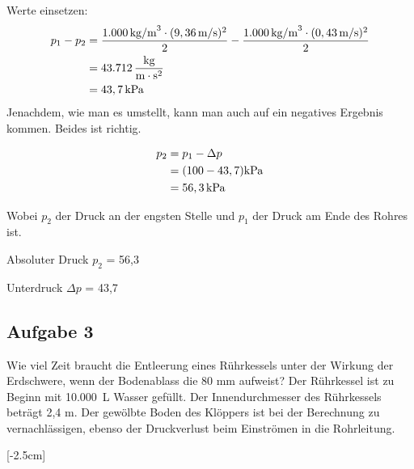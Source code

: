 \documentclass[a4paper,11pt]{article}
\newif\ifshowme
\begin{document}
\begin{marginfigure}[+2cm]
{\pp



Werte einsetzen: 
\begin{align*}
p_1 - p_2 &= \frac{1.000 \mskip3mu \text{kg/m}^3 \cdot (9,36\mskip3mu \text{m/s} )^2}{2} -  \frac{1.000 \mskip3mu \text{kg/m}^3 \cdot (0,43 \mskip3mu \text{m/s} )^2}{2} \\
&= 43.712 \mskip3mu \frac{\text{kg}}{\text{m} \cdot \text{s}^2} \\
&= 43,7 \mskip3mu \text{kPa}
\end{align*}
Jenachdem, wie man es umstellt, kann man auch auf ein negatives Ergebnis kommen. Beides ist richtig.

\begin{align*}
p_2 &= p_1 - \Delta p \\
	&= (100 - 43,7)\text{kPa}\\ &= 56,3\mskip3mu \text{kPa}
\end{align*}


Wobei $p_2$ der Druck an der engsten Stelle und $p_1$ der Druck am Ende des Rohres ist.
\par
Absoluter Druck $p_2$ = 56,3  \par 
Unterdruck $\Delta p$ = 43,7  \par 
}
\pagebreak
\else
\fi


\subsection*{Aufgabe 3}
Wie viel Zeit braucht die Entleerung eines Rührkessels unter der Wirkung der \mbox{Erdschwere}, wenn der Bodenablass die  80 mm aufweist? Der Rührkessel ist zu Beginn mit \mbox{10.000 L} Wasser gefüllt. Der Innendurchmesser des Rührkessels beträgt 2,4 m. Der gewölbte Boden des Klöppers ist bei der Berechnung zu vernachlässigen, ebenso der Druckverlust beim Einströmen in die Rohrleitung.




[-2.5cm]

\ifshowme
{}
\end{marginfigure}
\end{document}
